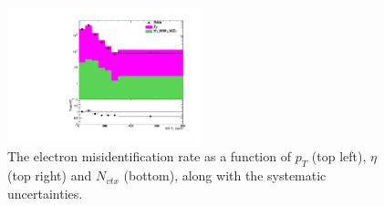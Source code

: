 \documentclass[thesis.tex]{subfiles}
\renewcommand\_{\textunderscore\allowbreak}
\begin{document}
\begin{figure}[!hbt]
  \centering
    \includegraphics[width=0.5\textwidth]{Figures/PLOT_ISRweight.pdf}
  \caption{The electron misidentification rate as a function of $p_T$ (top left), $\eta$ (top right) and $N_{vtx}$ (bottom), along with the systematic uncertainties.}
  \label{fig:apen-ISRJetPt}
\end{figure}
\end{document}
